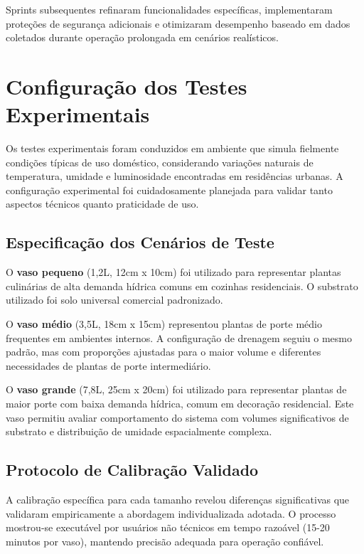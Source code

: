 Sprints subsequentes refinaram funcionalidades específicas, implementaram proteções de segurança adicionais e otimizaram desempenho baseado em dados coletados durante operação prolongada em cenários realísticos.

\section{Configuração dos Testes Experimentais}

Os testes experimentais foram conduzidos em ambiente que simula fielmente condições típicas de uso doméstico, considerando variações naturais de temperatura, umidade e luminosidade encontradas em residências urbanas. A configuração experimental foi cuidadosamente planejada para validar tanto aspectos técnicos quanto praticidade de uso.

\subsection{Especificação dos Cenários de Teste}

O \textbf{vaso pequeno} (1,2L, 12cm x 10cm) foi utilizado para representar plantas culinárias de alta demanda hídrica comuns em cozinhas residenciais. O substrato utilizado foi solo universal comercial padronizado.

O \textbf{vaso médio} (3,5L, 18cm x 15cm) representou plantas de porte médio frequentes em ambientes internos. A configuração de drenagem seguiu o mesmo padrão, mas com proporções ajustadas para o maior volume e diferentes necessidades de plantas de porte intermediário.

O \textbf{vaso grande} (7,8L, 25cm x 20cm) foi utilizado para representar plantas de maior porte com baixa demanda hídrica, comum em decoração residencial. Este vaso permitiu avaliar comportamento do sistema com volumes significativos de substrato e distribuição de umidade espacialmente complexa.

\subsection{Protocolo de Calibração Validado}

A calibração específica para cada tamanho revelou diferenças significativas que validaram empiricamente a abordagem individualizada adotada. O processo mostrou-se executável por usuários não técnicos em tempo razoável (15-20 minutos por vaso), mantendo precisão adequada para operação confiável.

